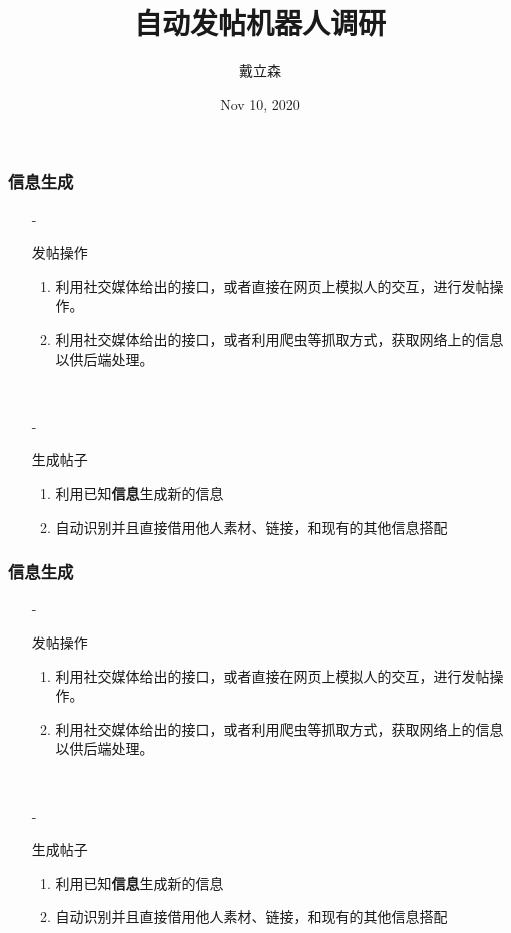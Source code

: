\documentclass[10pt]{beamer}
\title{
    {自动发帖机器人调研}
}
\author{戴立森}
\date{Nov 10, 2020}
\begin{document}
    \maketitle

        \begin{frame}
            \frametitle{信息生成}
            \begin{itemize}
                \item[-]{
                    发帖操作
                    \begin{enumerate}
                        \item 利用社交媒体给出的接口，或者直接在网页上模拟人的交互，进行发帖操作。
                        \item 利用社交媒体给出的接口，或者利用爬虫等抓取方式，获取网络上的信息以供后端处理。
                    \end{enumerate}
                    \hspace*{\fill}\\
                    }
                \item[-]{
                    生成帖子
                    \begin{enumerate}
                        \item 利用已知\textbf{信息}生成新的信息
                        \item 自动识别并且直接借用他人素材、链接，和现有的其他信息搭配
                    \end{enumerate}
                    } 
            \end{itemize}
        \end{frame}

        \begin{frame}
            \frametitle{信息生成}
            \begin{itemize}
                \item[-]{
                    发帖操作
                    \begin{enumerate}
                        \item 利用社交媒体给出的接口，或者直接在网页上模拟人的交互，进行发帖操作。
                        \item 利用社交媒体给出的接口，或者利用爬虫等抓取方式，获取网络上的信息以供后端处理。
                    \end{enumerate}
                    \hspace*{\fill}\\
                    }
                \item[-]{
                    生成帖子
                    \begin{enumerate}
                        \item 利用已知\textbf{信息}生成新的信息
                        \item 自动识别并且直接借用他人素材、链接，和现有的其他信息搭配
                    \end{enumerate}
                    } 
            \end{itemize}
        \end{frame}
        
\end{document}
